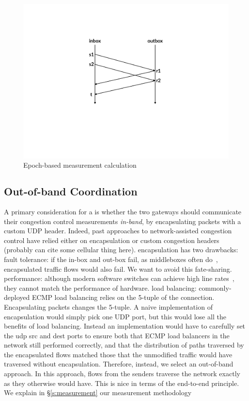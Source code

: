 \begin{figure}
    \centering
    \includegraphics[width=\columnwidth]{img/rate-calculation}
    \caption{Epoch-based measurement calculation}\label{fig:ratecalc}
\end{figure}
\begin{outline}

\subsection{Out-of-band Coordination}\label{s:design:oob}
\1 A primary consideration for a \name is whether the two gateways should communicate their congestion control measurements \emph{in-band}, by encapsulating packets with \eg a custom UDP header.
\1 Indeed, past approaches to network-assisted congestion control have relied either on encapsulation or custom congestion headers~\cite{xcp, rcp} (probably can cite some cellular thing here).
\1 encapsulation has two drawbacks:
    \2 fault tolerance: if the in-box and out-box fail, as middleboxes often do~\cite{aplomb}, encapsulated traffic flows would also fail. We want to avoid this fate-sharing.
    \2 performance: although modern software switches can achieve high line rates~\cite{netbricks, bess}, they cannot match the performance of hardware.  
    \2 load balancing: commonly-deployed ECMP load balancing relies on the 5-tuple of the connection. Encapsulating packets changes the 5-tuple. 
        \3 A naive implementation of encapsulation would simply pick one UDP port, but this would lose all the benefits of load balancing. 
        \3 Instead an implementation would have to carefully set the udp src and dest ports to ensure both that ECMP load balancers in the network still performed correctly, and that the distribution of paths traversed by the encapsulated flows matched those that the unmodified traffic would have traversed without encapsulation.
\1 Therefore, instead, we select an out-of-band approach. In this approach, flows from the senders traverse the network exactly as they otherwise would have. This is nice in terms of the end-to-end principle.
\1 We explain in \S\ref{s:measurement} our measurement methodology
\end{outline}

